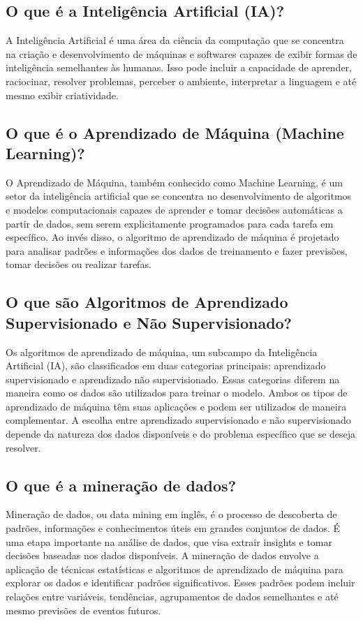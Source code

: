 \documentclass[conference]{IEEEtran}
\begin{document}
\subsection{O que é a Inteligência Artificial (IA)?}
A Inteligência Artificial é uma área da ciência da computação que se concentra na criação e desenvolvimento de máquinas e softwares capazes de exibir formas de inteligência semelhantes às humanas. Isso pode incluir a capacidade de aprender, raciocinar, resolver problemas, perceber o ambiente, interpretar a linguagem e até mesmo exibir criatividade.

\subsection{O que é o Aprendizado de Máquina (Machine Learning)?}
O Aprendizado de Máquina, também conhecido como Machine Learning, é um setor da inteligência artificial que se concentra no desenvolvimento de algoritmos e modelos computacionais capazes de aprender e tomar decisões automáticas a partir de dados, sem serem explicitamente programados para cada tarefa em específico. Ao invés disso, o algoritmo de aprendizado de máquina é projetado para analisar padrões e informações dos dados de treinamento e fazer previsões, tomar decisões ou realizar tarefas.


\subsection{O que são Algoritmos de Aprendizado Supervisionado e Não Supervisionado?}
Os algoritmos de aprendizado de máquina, um subcampo da Inteligência Artificial (IA), são classificados em duas categorias principais: aprendizado supervisionado e aprendizado não supervisionado. Essas categorias diferem na maneira como os dados são utilizados para treinar o modelo. Ambos os tipos de aprendizado de máquina têm suas aplicações e podem ser utilizados de maneira complementar. A escolha entre aprendizado supervisionado e não supervisionado depende da natureza dos dados disponíveis e do problema específico que se deseja resolver.

\subsection{O que é a mineração de dados?}
Mineração de dados, ou data mining em inglês, é o processo de descoberta de padrões, informações e conhecimentos úteis em grandes conjuntos de dados. É uma etapa importante na análise de dados, que visa extrair insights e tomar decisões baseadas nos dados disponíveis.
A mineração de dados envolve a aplicação de técnicas estatísticas e algoritmos de aprendizado de máquina para explorar os dados e identificar padrões significativos. Esses padrões podem incluir relações entre variáveis, tendências, agrupamentos de dados semelhantes e até mesmo previsões de eventos futuros.
\end{document}
